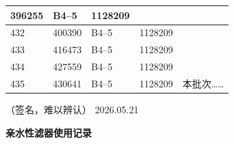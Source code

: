 \documentclass[UTF8,10pt,a4paper,fontset=fandol]{ctexart}
\newcommand{\fieldvalue}[1]{#1}
\newcommand{\handwritten}[1]{#1}
\begin{document}
\begin{center}
\begin{tabular}{|p{0.8cm}|p{2.2cm}|p{3.0cm}|p{3.0cm}|p{3.8cm}|}
\fieldvalue{396255} &
\fieldvalue{B4--5} &
\fieldvalue{1128209} & \\ \hline
\fieldvalue{432} &
\fieldvalue{400390} &
\fieldvalue{B4--5} &
\fieldvalue{1128209} & \\ \hline
\fieldvalue{433} &
\fieldvalue{416473} &
\fieldvalue{B4--5} &
\fieldvalue{1128209} & \\ \hline
\fieldvalue{434} &
\fieldvalue{427559} &
\fieldvalue{B4--5} &
\fieldvalue{1128209} & \\ \hline
\fieldvalue{435} &
\fieldvalue{430641} &
\fieldvalue{B4--5} &
\fieldvalue{1128209} &
\fieldvalue{\handwritten{本批次……}}
\\ \hline
\end{tabular}
\end{center}

\vfill

\begin{flushright}
\handwritten{（签名，难以辨认）}\hspace{1cm}
\handwritten{2026.05.21}
\end{flushright}

\newpage

\begin{center}
\textbf{亲水性滤器使用记录}
\end{center}
\end{document}
